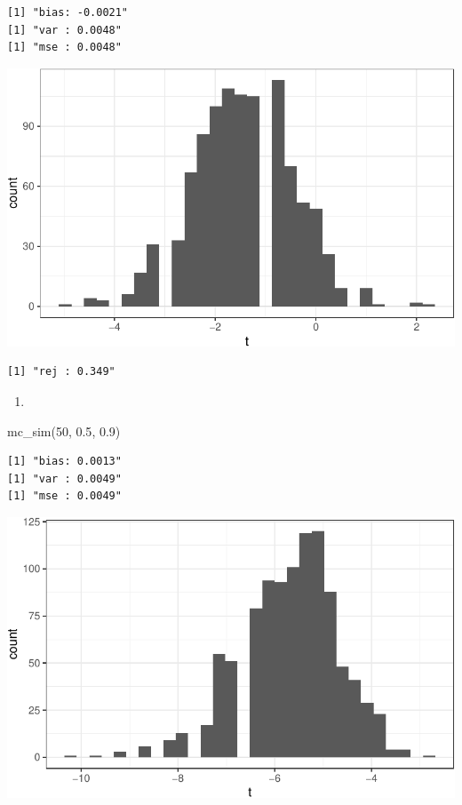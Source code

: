 \documentclass[
  letterpaper,
  DIV=11,
  numbers=noendperiod]{scrreprt}
\newenvironment{Shaded}{\begin{snugshade}}{\end{snugshade}}
\newcommand{\DecValTok}[1]{\textcolor[rgb]{0.68,0.00,0.00}{#1}}
\newcommand{\FloatTok}[1]{\textcolor[rgb]{0.68,0.00,0.00}{#1}}
\newcommand{\FunctionTok}[1]{\textcolor[rgb]{0.28,0.35,0.67}{#1}}
\newcommand{\NormalTok}[1]{\textcolor[rgb]{0.00,0.23,0.31}{#1}}
\providecommand{\tightlist}{%
  \setlength{\itemsep}{0pt}\setlength{\parskip}{0pt}}\usepackage{longtable,booktabs,array}
\begin{document}
\begin{verbatim}
[1] "bias: -0.0021"
[1] "var : 0.0048"
[1] "mse : 0.0048"
\end{verbatim}

\includegraphics{03-estimators_files/figure-pdf/unnamed-chunk-13-1.pdf}

\begin{verbatim}
[1] "rej : 0.349"
\end{verbatim}

\begin{enumerate}
\def\labelenumi{\arabic{enumi}.}
\setcounter{enumi}{5}
\tightlist
\item
\end{enumerate}

\begin{Shaded}
\begin{Highlighting}[]
\FunctionTok{mc\_sim}\NormalTok{(}\DecValTok{50}\NormalTok{, }\FloatTok{0.5}\NormalTok{, }\FloatTok{0.9}\NormalTok{)}
\end{Highlighting}
\end{Shaded}

\begin{verbatim}
[1] "bias: 0.0013"
[1] "var : 0.0049"
[1] "mse : 0.0049"
\end{verbatim}

\includegraphics{03-estimators_files/figure-pdf/unnamed-chunk-14-1.pdf}
\end{document}
